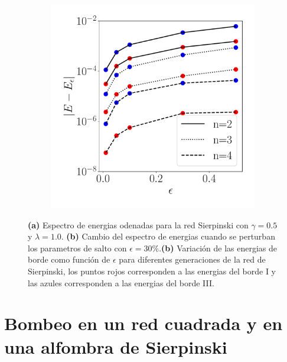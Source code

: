 \begin{figure}[h!]
\begin{subfigure}[b!]{0.33 \textwidth}
    \end{subfigure}
    \begin{subfigure}[b!]{0.33 \textwidth}
        \caption{}
        \includegraphics[width=\textwidth]{Imagenes/Resultados_Hoti_Fractal/pertubation_gen_fractal.pdf}
    \end{subfigure}\hspace*{-0.9em}

       \caption{\textbf{(a)} Espectro de energias odenadas para la red Sierpinski con $\gamma = 0.5$ y $\lambda = 1.0$. \textbf{(b)} Cambio del espectro de energias cuando se perturban los parametros de salto con $\epsilon = 30\%$.\textbf{(b)} Variación de las energias de borde como función de $\epsilon$ para diferentes generaciones de la red de Sierpinski, los puntos rojos corresponden a las energias del borde I y las azules corresponden a las energias del borde III.}
       \label{fig:spectre_fractal_epsi}
\end{figure}

\section{Bombeo en un red cuadrada y en una alfombra de Sierpinski}

